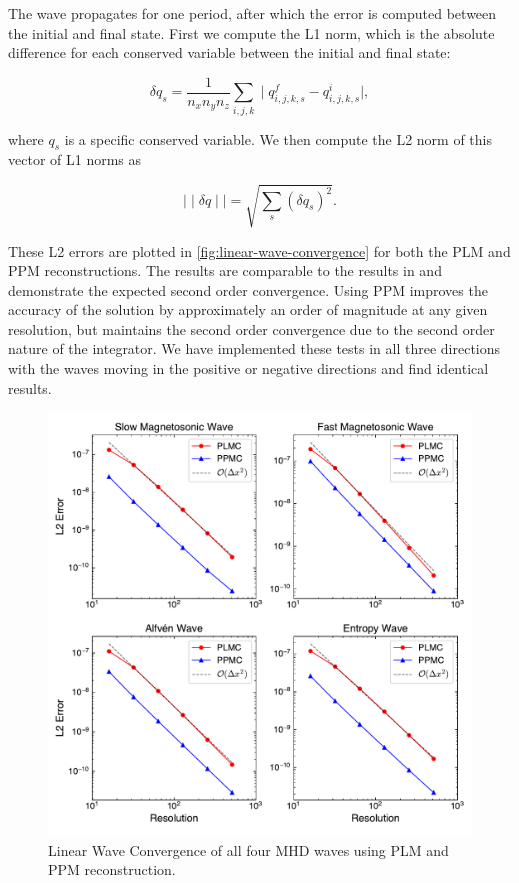 The wave propagates for one period, after which the error is computed between the initial and final state. First we compute the L1 norm, which is the absolute difference for each conserved variable between the initial and final state:

\begin{equation}
    \delta q_s = \frac{1}{n_x n_y n_z} \sum_{i,j,k} \mid q^f_{i,j,k,s} - q^i_{i,j,k,s} \mid,
\end{equation}

\noindent where $q_s$ is a specific conserved variable. We then compute the L2 norm of this vector of L1 norms as

\begin{equation}
    \mid \mid \delta q \mid \mid = \sqrt{\sum_s \left( \delta q_s \right)^2}.
\end{equation}

These L2 errors are plotted in \autoref{fig:linear-wave-convergence} for both the PLM and PPM reconstructions. The results are comparable to the results in \cite{stone_2009} and demonstrate the expected second order convergence. Using PPM improves the accuracy of the solution by approximately an order of magnitude at any given resolution, but maintains the second order convergence due to the second order nature of the integrator. We have implemented these tests in all three directions with the waves moving in the positive or negative directions and find identical results.

\begin{figure}[ht!]
    \includegraphics[width=\linewidth]{assets/3-mhd-tests/linear_convergence.pdf}
    \caption{Linear Wave Convergence of all four MHD waves using PLM and PPM reconstruction. }
    \label{fig:linear-wave-convergence}
\end{figure}


